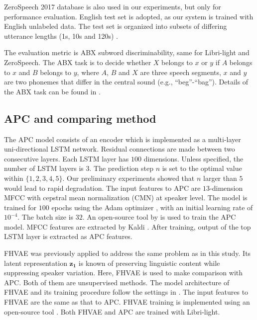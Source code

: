 \documentclass[a4paper]{article}
\newcommand{\quotes}[1]{``#1''}
\begin{document}
ZeroSpeech 2017 database is also used in our experiments, but only for performance evaluation.  English test set is adopted, as our system is trained with English unlabeled data. 
The test set is organized into subsets of differing utterance lengths (1s, 10s and 120s)  \cite{dunbar2017zero}.


The evaluation metric is  ABX subword discriminability, same for    Libri-light and ZeroSpeech.
The ABX task is to decide whether $X$ belongs to $x$ or $y$ if $A$ belongs to $x$ and $B$ belongs to $y$, where $A$, $B$ and $X$ are three speech segments, $x$ and $y$ are two phonemes that differ in the central sound (e.g., \quotes{beg}-\quotes{bag}). Details of the ABX task can be found in \cite{dunbar2017zero}. 
\subsection{APC and comparing method}
The APC model consists of an encoder which is implemented as a  multi-layer uni-directional LSTM network. Residual connections are made between two consecutive layers.  
Each LSTM layer has $100$ dimensions.
Unless specified, the number of LSTM layers is $3$.
The prediction step $n$ is set to  the optimal value within $\{1,2,3,4,5\}$. Our preliminary experiments showed that $n$ larger than $5$ would lead to rapid degradation. 
The input features to APC are $13$-dimension MFCC with cepstral mean normalization (CMN) at speaker level. 
The model is trained for $100$ epochs using the Adam optimizer \cite{kingma2014adam}, with an initial learning rate of $10^{-4}$. The batch size is  $32$. An open-source tool by \cite{Chung2019} is used to train the APC model. MFCC features are extracted by Kaldi \cite{povey2011kaldi}. After training, output of the top LSTM layer is extracted as APC features.

FHVAE was previously applied \cite{Feng2019improving} to address the same problem as in this study. Its latent representation $\bm{z_1}$ is known of preserving linguistic content while suppressing speaker variation. Here, FHVAE is used to make comparison with APC. Both of them are unsupervised methods. The model architecture of FHVAE and its training procedure follow the settings in \cite{Feng2019improving}.
The input features to FHVAE are  the same as  that to  APC. FHVAE training is implemented using an open-source tool \cite{hsu2017nips}. Both FHVAE and APC are trained with Libri-light. 
\end{document}
